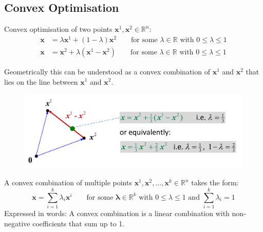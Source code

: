 \documentclass[11pt]{article}
\begin{document}
\subsection{Convex Optimisation}
Convex optimisation of two points $\textbf{x}^1, \textbf{x}^2\in\mathbb{R}^n$:
\begin{align*}
	\textbf{x} &= \lambda\textbf{x}^1 + (1-\lambda) \textbf{x}^2\qquad\text{for some }\lambda\in\mathbb{R}\text{ with }0\leq\lambda\leq 1\\
	\textbf{x} &= \textbf{x}^2 + \lambda(\textbf{x}^1 - \textbf{x}^2)\qquad\text{for some }\lambda\in\mathbb{R}\text{ with }0\leq\lambda\leq 1
\end{align*}

\noindent
Geometrically this can be understood as a convex combination of $\textbf{x}^1$ and $\textbf{x}^2$ that lies on the line between $\textbf{x}^1$ and $\textbf{x}^2$.

\begin{figure}[H]
	\centering
	\includegraphics[width=0.7\linewidth, keepaspectratio]{convex_combination}
	\label{fig:convexcombination}
\end{figure}

\noindent
A convex combination of multiple points $ \textbf{x}^1, \textbf{x}^2,\dots,\textbf{x}^k\in\mathbb{R}^n$ takes the form:
\begin{equation*}
	\textbf{x} = \sum_{i=1}^{k} \lambda_i \textbf{x}^i\qquad \text{for some }\boldsymbol{\lambda}\in\mathbb{R}^k\text{ with }0\leq\lambda\leq 1\text{ and }\sum_{i=1}^{k} \lambda_i = 1
\end{equation*}
\noindent
Expressed in words: A convex combination is a linear combination with non-negative coefficients that sum up to 1.
\end{document}
